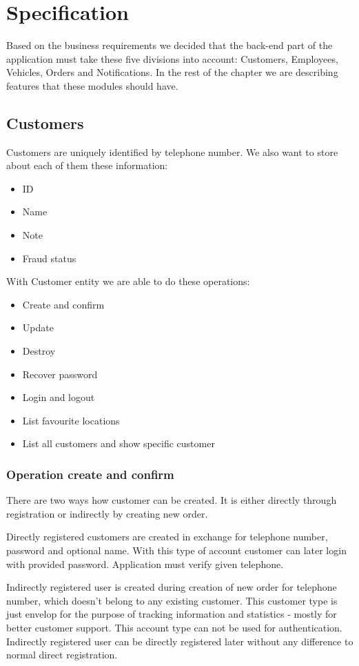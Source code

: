\chapter{Specification}

	Based on the business requirements we decided that the back-end part of the application must take these five divisions into account: Customers, Employees, Vehicles, Orders and Notifications. In the rest of the chapter we are describing features that these modules should have.
	
	\section{Customers}
		Customers are uniquely identified by telephone number. We also want to store about each of them these information:
		\begin{itemize}
			\item ID
			\item Name
			\item Note
			\item Fraud status
		\end{itemize}
	
		With Customer entity we are able to do these operations:
		\begin{itemize}
			\item Create and confirm
			\item Update
			\item Destroy
			\item Recover password
			\item Login and logout
			\item List favourite locations
			\item List all customers and show specific customer
		\end{itemize}
		\subsection{Operation create and confirm}
			There are two ways how customer can be created. It is either directly through registration or indirectly by creating new order.
			
			Directly registered customers are created in exchange for telephone number, password and optional name. With this type of account customer can later login with provided password. Application must verify given telephone.
			
			Indirectly registered user is created during creation of new order for telephone number, which doesn't belong to any existing customer. This customer type is just envelop for the purpose of tracking information and statistics - mostly for better customer support. This account type can not be used for authentication. Indirectly registered user can be directly registered later without any difference to normal direct registration.
		
